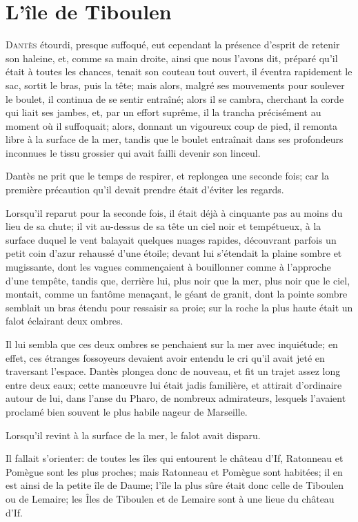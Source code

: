 \chapter{L'île de Tiboulen}

\lettrine{D}{antès} étourdi, presque suffoqué, eut cependant la présence d'esprit de retenir son haleine, et, comme sa main droite, ainsi que nous l'avons dit, préparé qu'il était à toutes les chances, tenait son couteau tout ouvert, il éventra rapidement le sac, sortit le bras, puis la tête; mais alors, malgré ses mouvements pour soulever le boulet, il continua de se sentir entraîné; alors il se cambra, cherchant la corde qui liait ses jambes, et, par un effort suprême, il la trancha précisément au moment où il suffoquait; alors, donnant un vigoureux coup de pied, il remonta libre à la surface de la mer, tandis que le boulet entraînait dans ses profondeurs inconnues le tissu grossier qui avait failli devenir son linceul.

Dantès ne prit que le temps de respirer, et replongea une seconde fois; car la première précaution qu'il devait prendre était d'éviter les regards.

Lorsqu'il reparut pour la seconde fois, il était déjà à cinquante pas au moins du lieu de sa chute; il vit au-dessus de sa tête un ciel noir et tempétueux, à la surface duquel le vent balayait quelques nuages rapides, découvrant parfois un petit coin d'azur rehaussé d'une étoile; devant lui s'étendait la plaine sombre et mugissante, dont les vagues commençaient à bouillonner comme à l'approche d'une tempête, tandis que, derrière lui, plus noir que la mer, plus noir que le ciel, montait, comme un fantôme menaçant, le géant de granit, dont la pointe sombre semblait un bras étendu pour ressaisir sa proie; sur la roche la plus haute était un falot éclairant deux ombres.

Il lui sembla que ces deux ombres se penchaient sur la mer avec inquiétude; en effet, ces étranges fossoyeurs devaient avoir entendu le cri qu'il avait jeté en traversant l'espace. Dantès plongea donc de nouveau, et fit un trajet assez long entre deux eaux; cette manœuvre lui était jadis familière, et attirait d'ordinaire autour de lui, dans l'anse du Pharo, de nombreux admirateurs, lesquels l'avaient proclamé bien souvent le plus habile nageur de Marseille.

Lorsqu'il revint à la surface de la mer, le falot avait disparu.

Il fallait s'orienter: de toutes les îles qui entourent le château d'If, Ratonneau et Pomègue sont les plus proches; mais Ratonneau et Pomègue sont habitées; il en est ainsi de la petite île de Daume; l'île la plus sûre était donc celle de Tiboulen ou de Lemaire; les Îles de Tiboulen et de Lemaire sont à une lieue du château d'If.

